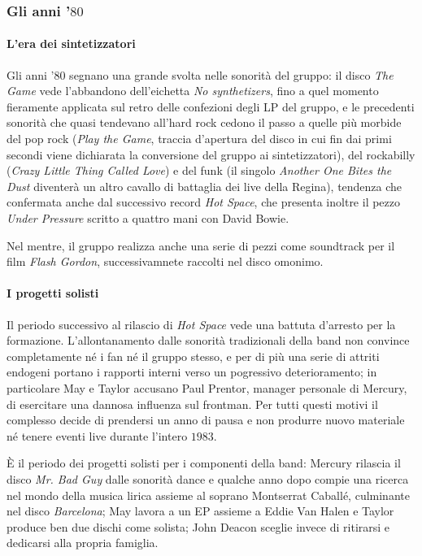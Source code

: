 \documentclass[12pt]{article}
\begin{document}
\subsubsection{Gli anni '\(80\)}
\paragraph{L'era dei sintetizzatori}
Gli anni '80 segnano una grande svolta nelle sonorità del gruppo: il disco \emph{The Game} vede l'abbandono dell'eichetta \emph{No synthetizers}, fino a quel momento fieramente applicata sul retro delle confezioni degli LP del gruppo, e le precedenti sonorità che quasi tendevano all'hard rock cedono il passo a quelle più morbide del pop rock (\emph{Play the Game}, traccia d'apertura del disco in cui fin dai primi secondi viene dichiarata la conversione del gruppo ai sintetizzatori), del rockabilly (\emph{Crazy Little Thing Called Love}) e del funk (il singolo \emph{Another One Bites the Dust} diventerà un altro cavallo di battaglia dei live della Regina), tendenza che confermata anche dal successivo record \emph{Hot Space}, che presenta inoltre il pezzo \emph{Under Pressure} scritto a quattro mani con David Bowie.

Nel mentre, il gruppo realizza anche una serie di pezzi come soundtrack per il film \emph{Flash Gordon}, successivamnete raccolti nel disco omonimo.
\paragraph{I progetti solisti}
Il periodo successivo al rilascio di \emph{Hot Space} vede una battuta d'arresto per la formazione. L'allontanamento dalle sonorità tradizionali della band non convince completamente né i fan né il gruppo stesso, e per di più una serie di attriti endogeni portano i rapporti interni verso un pogressivo deterioramento; in particolare May e Taylor accusano Paul Prentor, manager personale di Mercury, di esercitare una dannosa influenza sul frontman. Per tutti questi motivi il complesso decide di prendersi un anno di pausa e non produrre nuovo materiale né tenere eventi live durante l'intero \(1983\).

È il periodo dei progetti solisti per i componenti della band: Mercury rilascia il disco \emph{Mr. Bad Guy} dalle sonorità dance e qualche anno dopo compie una ricerca nel mondo della musica lirica assieme al soprano Montserrat Caballé, culminante nel disco \emph{Barcelona}; May lavora a un EP assieme a Eddie Van Halen e Taylor produce ben due dischi come solista; John Deacon sceglie invece di ritirarsi e dedicarsi alla propria famiglia.
\end{document}
